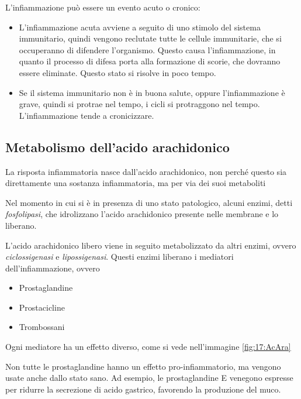 L'infiammazione può essere un evento acuto o cronico:

\begin{itemize}
\item
L'infiammazione acuta avviene a seguito di uno stimolo del sistema
immunitario, quindi vengono reclutate tutte le cellule immunitarie,
che si occuperanno di difendere l'organismo. Questo causa
l'infiammazione, in quanto il processo di difesa porta alla formazione
di scorie, che dovranno essere eliminate. Questo stato si risolve in
poco tempo.
\item
Se il sistema immunitario non è in buona salute, oppure
l'infiammazione è grave, quindi si protrae nel tempo, i cicli si
protraggono nel tempo. L'infiammazione tende a cronicizzare.
\end{itemize}

\subsection{Metabolismo dell'acido arachidonico}

La risposta infiammatoria nasce dall'acido
arachidonico,
non perché questo sia direttamente una sostanza infiammatoria, ma per
via dei suoi metaboliti

Nel momento in cui si è in presenza di uno stato patologico, alcuni
enzimi, detti \emph{fosfolipasi}, che idrolizzano l'acido arachidonico
presente nelle membrane e lo liberano.

L'acido arachidonico libero viene in seguito metabolizzato da altri
enzimi, ovvero \emph{ciclossigenasi} e \emph{lipossigenasi}. Questi
enzimi liberano i mediatori dell'infiammazione, ovvero

\begin{itemize}
\item
Prostaglandine
\item
Prostacicline
\item
Trombossani
\end{itemize}

Ogni mediatore ha un effetto diverso, come si vede nell'immagine \ref{fig:17:AcAra}


Non tutte le prostaglandine hanno un effetto pro-infiammatorio, ma
vengono usate anche dallo stato sano. Ad esempio, le prostaglandine E
venegono espresse per ridurre la secrezione di acido gastrico, favorendo
la produzione del muco.

